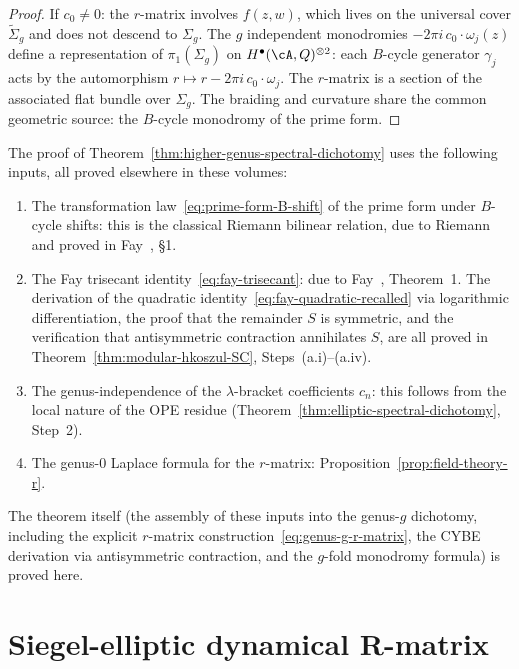 \begin{proof}
If $c_0 \ne 0$: the $r$-matrix involves $f(z,w)$, which lives
on the universal cover $\widetilde{\Sigma}_g$ and does not
descend to $\Sigma_g$. The $g$
independent monodromies $-2\pi i\, c_0 \cdot \omega_j(z)$
define a representation of $\pi_1(\Sigma_g)$ on
$H^\bullet(\cA,Q)^{\otimes 2}$: each $B$-cycle generator
$\gamma_j$ acts by the automorphism
$r \mapsto r - 2\pi i\, c_0 \cdot \omega_j$.
The $r$-matrix is a section of the associated flat bundle over
$\Sigma_g$. The braiding and curvature share
the common geometric source: the $B$-cycle monodromy of the
prime form.
\end{proof}

\begin{remark}
\label{rem:genus-g-dichotomy-provenance}
The proof of
Theorem~\ref{thm:higher-genus-spectral-dichotomy}
uses the following inputs, all proved elsewhere in these volumes:
\begin{enumerate}[label=\textup{(\roman*)}]
\item The transformation law~\eqref{eq:prime-form-B-shift}
 of the prime form under $B$-cycle shifts: this is the
 classical Riemann bilinear relation, due to Riemann and
 proved in Fay~\cite{Fay73}, \S1.
\item The Fay trisecant identity~\eqref{eq:fay-trisecant}:
 due to Fay~\cite{Fay73}, Theorem~1. The derivation of the
 quadratic identity~\eqref{eq:fay-quadratic-recalled} via
 logarithmic differentiation, the proof that the remainder
 $S$ is symmetric, and the verification that antisymmetric
 contraction annihilates $S$, are all proved in
 Theorem~\ref{thm:modular-hkoszul-SC}, Steps~(a.i)--(a.iv).
\item The genus-independence of the $\lambda$-bracket
 coefficients $c_n$: this follows from the local nature of
 the OPE residue
 (Theorem~\ref{thm:elliptic-spectral-dichotomy}, Step~2).
\item The genus-$0$ Laplace formula for the $r$-matrix:
 Proposition~\ref{prop:field-theory-r}.
\end{enumerate}
The theorem itself (the assembly of these inputs into the
genus-$g$ dichotomy, including the explicit $r$-matrix
construction~\eqref{eq:genus-g-r-matrix}, the CYBE
derivation via antisymmetric contraction, and the
$g$-fold monodromy formula) is proved here.
\end{remark}

\section{Siegel-elliptic dynamical R-matrix}
\label{sec:sbc-supplement}

